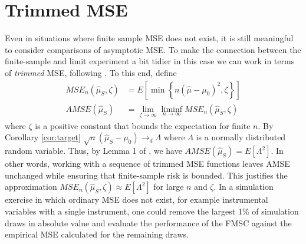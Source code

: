 \section{Trimmed MSE}
\label{append:trim}
    Even in situations where finite sample MSE does not exist, it is still meaningful to consider comparisons of asymptotic MSE.
    To make the connection between the finite-sample and limit experiment a bit tidier in this case we can work in terms of \emph{trimmed} MSE,  following \cite{HansenShrink}. 
    To this end, define
    \begin{align*}
      MSE_n(\widehat{\mu}_S, \zeta) &= E\left[ \min\left\{ n(\widehat{\mu} - \mu_0)^2, \zeta  \right\} \right]\\
      AMSE(\widehat{\mu}_S) &= \lim_{\zeta \rightarrow \infty} \liminf_{n\rightarrow \infty} MSE_n(\widehat{\mu}_S, \zeta)
    \end{align*}
    where $\zeta$ is a positive constant that bounds the expectation for finite $n$.
    By Corollary \ref{cor:target} $\sqrt{n}(\widehat{\mu}_S-\mu_0) \rightarrow_d \Lambda$ where $\Lambda$ is a normally distributed random variable.
    Thus, by Lemma 1 of \cite{HansenShrink}, we have $AMSE(\widehat{\mu}_S) = E[\Lambda^2]$.
    In other words, working with a sequence of trimmed MSE functions leaves AMSE unchanged while ensuring that finite-sample risk is bounded.
    This justifies the approximation $MSE_n(\widehat{\mu}_S, \zeta) \approx E[\Lambda^2]$ for large $n$ and $\zeta$.
    In a simulation exercise in which ordinary MSE does not exist, for example instrumental variables with a single instrument, one could remove the largest 1\% of simulation draws in absolute value and evaluate the performance of the FMSC against the empirical MSE calculated for the remaining draws.

